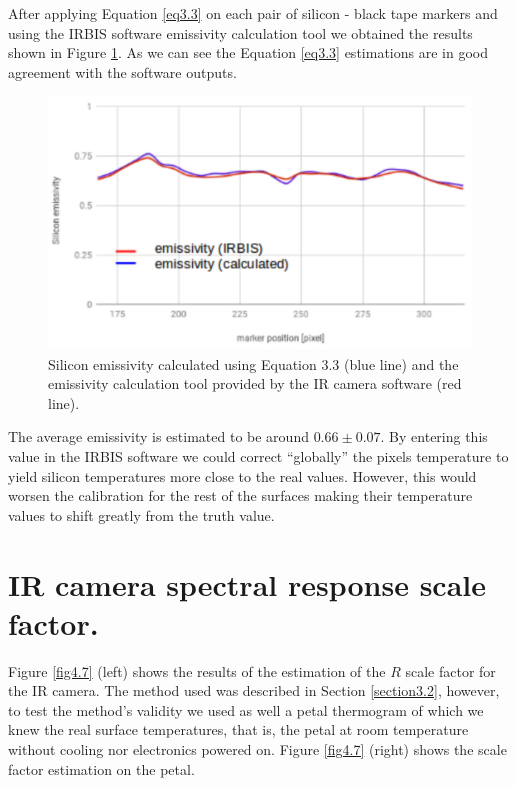 		After applying Equation \ref{eq3.3} on each pair of silicon - black tape markers and using the IRBIS software emissivity calculation tool we obtained the results shown in Figure \ref{fig4.6}. As we can see the Equation \ref{eq3.3} estimations are in good agreement with the software outputs. 
	
		\begin{figure}[ht!]
			\centering
			\captionsetup{justification=centering,margin=2cm}
			\includegraphics[scale=0.35]{Figures/Chapter04/SiliconEmissivityCalculatedVSIRBIS.jpg}
			\caption{Silicon emissivity calculated using Equation 3.3 (blue line) and the emissivity calculation tool provided by the IR camera software (red line).}\label{fig4.6}
		\end{figure}
		
		The average emissivity is estimated to be around $0.66 \pm 0.07$. By entering this value in the IRBIS software we could correct “globally” the pixels temperature to yield silicon temperatures more close to the real values. However, this would worsen the calibration for the rest of the surfaces making their temperature values to shift greatly from the truth value.\bigskip
		
	\section{IR camera spectral response scale factor.}\label{section4.4}
	
		Figure \ref{fig4.7} (left) shows the results of the estimation of the $R$ scale factor for the IR camera. The method used was described in Section \ref{section3.2}, however, to test the method’s validity we used as well a petal thermogram of which we knew the real surface temperatures, that is, the petal at room temperature without cooling nor electronics powered on. Figure \ref{fig4.7} (right) shows the scale factor estimation on the petal.
		
